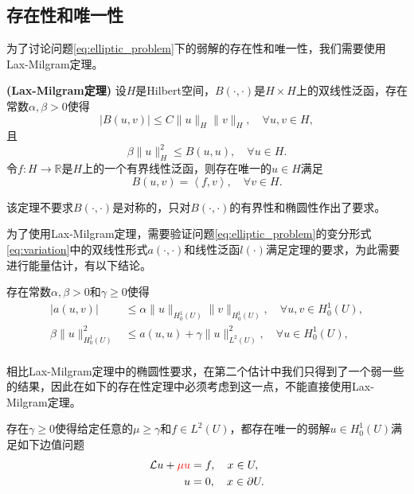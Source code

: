 \documentclass[a4paper,10pt]{ctexart}
\begin{document}
\subsection{存在性和唯一性}
为了讨论问题\eqref{eq:elliptic_problem}下的弱解的存在性和唯一性，我们需要使用Lax-Milgram定理。
\begin{theorem}{\normalfont\textbf{(Lax-Milgram定理)}}
    设$ H $是Hilbert空间，$ B(\cdot,\cdot) $是$ H \times H $上的双线性泛函，存在常数$ \alpha,\beta>0 $使得
    \begin{equation}
        |B(u,v)| \leqslant C \| u \|_H \| v \|_H,\quad \forall u,v\in H,
    \end{equation}
    且
    \begin{equation}
        \beta \| u \|_H^2 \leqslant B(u,u),\quad \forall u\in H.
    \end{equation}
    令$ f:H\to \mathbb{R} $是$ H $上的一个有界线性泛函，则存在唯一的$ u\in H $满足
    \begin{equation}
        B(u,v) = \left<f, v\right>,\quad \forall v\in H.
    \end{equation}
\end{theorem}
\noindent 该定理不要求$ B(\cdot,\cdot) $是对称的，只对$ B(\cdot,\cdot) $的有界性和椭圆性作出了要求。

为了使用Lax-Milgram定理，需要验证问题\eqref{eq:elliptic_problem}的变分形式\eqref{eq:variation}中的双线性形式$a(\cdot,\cdot)$和线性泛函$l(\cdot)$满足定理的要求，为此需要进行能量估计，有以下结论。
\begin{theorem}
    存在常数$ \alpha,\beta>0 $和$ \gamma\geqslant 0 $使得
    \begin{equation}
        \begin{aligned}
            |a(u,v)| &\leqslant \alpha \| u \|_{H^1_0(U)} \| v \|_{H^1_0(U)},\quad \forall u,v\in H^1_0(U),\\
            \beta \| u \|_{H^1_0(U)}^2 &\leqslant a(u,u) + \gamma\| u \|_{L^2(U)}^2 ,\quad \forall u\in H^1_0(U),\\
        \end{aligned}
    \end{equation}
\end{theorem}
\noindent 相比Lax-Milgram定理中的椭圆性要求，在第二个估计中我们只得到了一个弱一些的结果，因此在如下的存在性定理中必须考虑到这一点，不能直接使用Lax-Milgram定理。

\begin{theorem}
    存在$ \gamma\geqslant 0 $使得给定任意的$ \mu\geqslant \gamma $和$ f\in L^2(U) $，都存在唯一的弱解$ u\in H^1_0(U) $满足如下边值问题
    \begin{equation}\label{eq:elliptic_existence}
        \begin{aligned}
            \mathcal{L}u + \textcolor{red}{\mu u} &= f, \quad x\in U,\\
            u &= 0, \quad x\in \partial U.
        \end{aligned}
    \end{equation}
\end{theorem}
\end{document}
